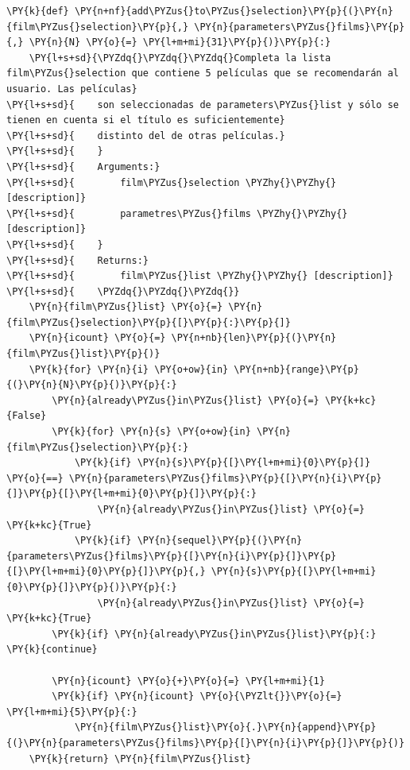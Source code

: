     \begin{tcolorbox}[breakable, size=fbox, boxrule=1pt, pad at break*=1mm,colback=cellbackground, colframe=cellborder]
\begin{Verbatim}[commandchars=\\\{\}]
\PY{k}{def} \PY{n+nf}{add\PYZus{}to\PYZus{}selection}\PY{p}{(}\PY{n}{film\PYZus{}selection}\PY{p}{,} \PY{n}{parameters\PYZus{}films}\PY{p}{,} \PY{n}{N} \PY{o}{=} \PY{l+m+mi}{31}\PY{p}{)}\PY{p}{:}
    \PY{l+s+sd}{\PYZdq{}\PYZdq{}\PYZdq{}Completa la lista film\PYZus{}selection que contiene 5 películas que se recomendarán al usuario. Las películas}
\PY{l+s+sd}{    son seleccionadas de parameters\PYZus{}list y sólo se tienen en cuenta si el título es suficientemente}
\PY{l+s+sd}{    distinto del de otras películas.}
\PY{l+s+sd}{    }
\PY{l+s+sd}{    Arguments:}
\PY{l+s+sd}{        film\PYZus{}selection \PYZhy{}\PYZhy{} [description]}
\PY{l+s+sd}{        parametres\PYZus{}films \PYZhy{}\PYZhy{} [description]}
\PY{l+s+sd}{    }
\PY{l+s+sd}{    Returns:}
\PY{l+s+sd}{        film\PYZus{}list \PYZhy{}\PYZhy{} [description]}
\PY{l+s+sd}{    \PYZdq{}\PYZdq{}\PYZdq{}} 
    \PY{n}{film\PYZus{}list} \PY{o}{=} \PY{n}{film\PYZus{}selection}\PY{p}{[}\PY{p}{:}\PY{p}{]}
    \PY{n}{icount} \PY{o}{=} \PY{n+nb}{len}\PY{p}{(}\PY{n}{film\PYZus{}list}\PY{p}{)}    
    \PY{k}{for} \PY{n}{i} \PY{o+ow}{in} \PY{n+nb}{range}\PY{p}{(}\PY{n}{N}\PY{p}{)}\PY{p}{:}
        \PY{n}{already\PYZus{}in\PYZus{}list} \PY{o}{=} \PY{k+kc}{False}
        \PY{k}{for} \PY{n}{s} \PY{o+ow}{in} \PY{n}{film\PYZus{}selection}\PY{p}{:}
            \PY{k}{if} \PY{n}{s}\PY{p}{[}\PY{l+m+mi}{0}\PY{p}{]} \PY{o}{==} \PY{n}{parameters\PYZus{}films}\PY{p}{[}\PY{n}{i}\PY{p}{]}\PY{p}{[}\PY{l+m+mi}{0}\PY{p}{]}\PY{p}{:} 
                \PY{n}{already\PYZus{}in\PYZus{}list} \PY{o}{=} \PY{k+kc}{True}
            \PY{k}{if} \PY{n}{sequel}\PY{p}{(}\PY{n}{parameters\PYZus{}films}\PY{p}{[}\PY{n}{i}\PY{p}{]}\PY{p}{[}\PY{l+m+mi}{0}\PY{p}{]}\PY{p}{,} \PY{n}{s}\PY{p}{[}\PY{l+m+mi}{0}\PY{p}{]}\PY{p}{)}\PY{p}{:} 
                \PY{n}{already\PYZus{}in\PYZus{}list} \PY{o}{=} \PY{k+kc}{True}            
        \PY{k}{if} \PY{n}{already\PYZus{}in\PYZus{}list}\PY{p}{:} \PY{k}{continue}
            
        \PY{n}{icount} \PY{o}{+}\PY{o}{=} \PY{l+m+mi}{1}
        \PY{k}{if} \PY{n}{icount} \PY{o}{\PYZlt{}}\PY{o}{=} \PY{l+m+mi}{5}\PY{p}{:}
            \PY{n}{film\PYZus{}list}\PY{o}{.}\PY{n}{append}\PY{p}{(}\PY{n}{parameters\PYZus{}films}\PY{p}{[}\PY{n}{i}\PY{p}{]}\PY{p}{)}
    \PY{k}{return} \PY{n}{film\PYZus{}list}
\end{Verbatim}
\end{tcolorbox}

